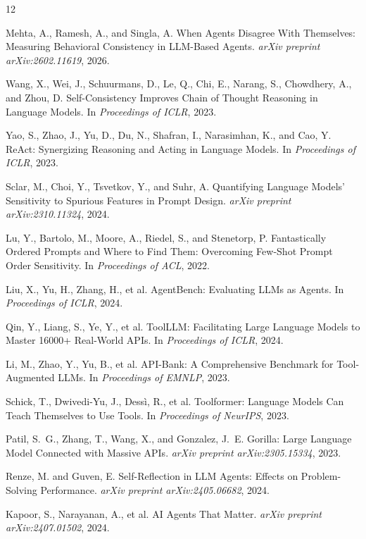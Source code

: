 \documentclass[letterpaper]{article}
\begin{document}

\begin{thebibliography}{12}

Mehta, A., Ramesh, A., and Singla, A.
\newblock When Agents Disagree With Themselves: Measuring Behavioral Consistency in LLM-Based Agents.
\newblock \textit{arXiv preprint arXiv:2602.11619}, 2026.

Wang, X., Wei, J., Schuurmans, D., Le, Q., Chi, E., Narang, S., Chowdhery, A., and Zhou, D.
\newblock Self-Consistency Improves Chain of Thought Reasoning in Language Models.
\newblock In \textit{Proceedings of ICLR}, 2023.

Yao, S., Zhao, J., Yu, D., Du, N., Shafran, I., Narasimhan, K., and Cao, Y.
\newblock ReAct: Synergizing Reasoning and Acting in Language Models.
\newblock In \textit{Proceedings of ICLR}, 2023.

Sclar, M., Choi, Y., Tsvetkov, Y., and Suhr, A.
\newblock Quantifying Language Models' Sensitivity to Spurious Features in Prompt Design.
\newblock \textit{arXiv preprint arXiv:2310.11324}, 2024.

Lu, Y., Bartolo, M., Moore, A., Riedel, S., and Stenetorp, P.
\newblock Fantastically Ordered Prompts and Where to Find Them: Overcoming Few-Shot Prompt Order Sensitivity.
\newblock In \textit{Proceedings of ACL}, 2022.

Liu, X., Yu, H., Zhang, H., et al.
\newblock AgentBench: Evaluating LLMs as Agents.
\newblock In \textit{Proceedings of ICLR}, 2024.

Qin, Y., Liang, S., Ye, Y., et al.
\newblock ToolLLM: Facilitating Large Language Models to Master 16000+ Real-World APIs.
\newblock In \textit{Proceedings of ICLR}, 2024.

Li, M., Zhao, Y., Yu, B., et al.
\newblock API-Bank: A Comprehensive Benchmark for Tool-Augmented LLMs.
\newblock In \textit{Proceedings of EMNLP}, 2023.

Schick, T., Dwivedi-Yu, J., Dess\`{i}, R., et al.
\newblock Toolformer: Language Models Can Teach Themselves to Use Tools.
\newblock In \textit{Proceedings of NeurIPS}, 2023.

Patil, S.~G., Zhang, T., Wang, X., and Gonzalez, J.~E.
\newblock Gorilla: Large Language Model Connected with Massive APIs.
\newblock \textit{arXiv preprint arXiv:2305.15334}, 2023.

Renze, M. and Guven, E.
\newblock Self-Reflection in LLM Agents: Effects on Problem-Solving Performance.
\newblock \textit{arXiv preprint arXiv:2405.06682}, 2024.

Kapoor, S., Narayanan, A., et al.
\newblock AI Agents That Matter.
\newblock \textit{arXiv preprint arXiv:2407.01502}, 2024.

\end{thebibliography}
\end{document}
